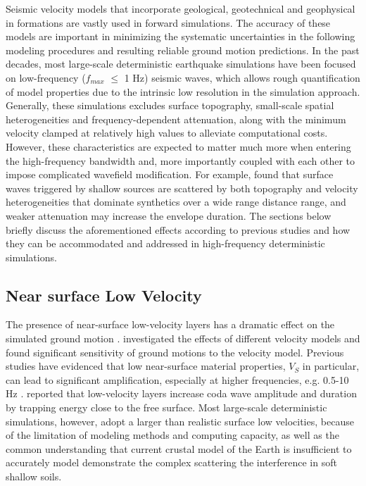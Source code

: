 Seismic velocity models that incorporate geological, geotechnical and geophysical in formations are vastly used in forward simulations. The accuracy of these models are important in minimizing the systematic uncertainties in the following modeling procedures and resulting reliable ground motion predictions. In the past decades, most large-scale deterministic earthquake simulations have been focused on low-frequency ($f_{max}$ $\leqslant$ 1 Hz) seismic waves, which allows rough quantification of model properties due to the intrinsic low resolution in the simulation approach. Generally, these simulations excludes surface topography, small-scale spatial heterogeneities and frequency-dependent attenuation, along with the minimum velocity clamped at relatively high values to alleviate computational costs. However, these characteristics are expected to matter much more when entering the high-frequency bandwidth and, more importantly coupled with each other to impose complicated wavefield modification. For example, \citet{laiShallowBasinStructure2020} found that surface waves triggered by shallow sources are scattered by both topography and velocity heterogeneities that dominate synthetics over a wide range distance range, and weaker attenuation may increase the envelope duration.
The sections below briefly discuss the aforementioned effects according to previous studies and how they can be accommodated and addressed in high-frequency deterministic simulations.


\subsection{Near surface Low Velocity}
The presence of near-surface low-velocity layers has a dramatic effect on the simulated ground motion \citep{imperatoriRoleTopographyLateral2015}.
\citet{shawUnifiedStructuralRepresentation2015} investigated the effects of different velocity models and found significant sensitivity of ground motions to the velocity model. Previous studies have evidenced that low near-surface material properties, $V_S$ in particular, can lead to significant amplification, especially at higher frequencies, e.g. 0.5-10 Hz \citep{booreSiteAmplificationsGeneric1997,poggiDerivationReferenceShearWave2011}. \citet{imperatoriBroadbandNearfieldGround2013} reported that low-velocity layers increase coda wave amplitude and duration by trapping energy close to the free surface.
Most large-scale deterministic simulations, however, adopt a larger than realistic surface low velocities, because of the limitation of modeling methods and computing capacity, as well as the common understanding that current crustal model of the Earth is insufficient to accurately model demonstrate the complex scattering the interference in soft shallow soils.

